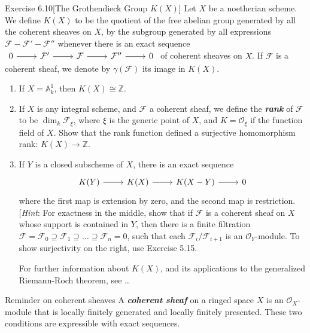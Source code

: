 \begin{thing2}{Exercise 6.10}[The Grothendieck Group $K(X)$]\leavevmode
	Let $X$ be a noetherian scheme. We define $K(X)$ to be the quotient of the free abelian group generated by all the coherent sheaves on $X$, by the subgroup generated by all expressions $\mathcal{F}-\mathcal{F}'-\mathcal{F}''$ whenever there is an exact sequence $\begin{tikzcd}
		0\arrow[r]&\mathcal{F}'\arrow[r]&\mathcal{F}\arrow[r]&\mathcal{F}''\arrow[r]&0
	\end{tikzcd}$ of coherent sheaves on $X$. If $\mathcal{F}$ is a coherent sheaf, we denote by $\gamma(\mathcal{F})$ its image in $K(X)$.
	 \begin{enumerate}[label=\alph*.]
		\item If $X=\mathbb{A}^1_k$, then $K(X)\cong \mathbb{Z}$.
		\item If $X$ is any integral scheme, and $\mathcal{F}$ a coherent sheaf, we define the \textit{\textbf{rank}} of $\mathcal{F}$ to be $\dim_k\mathcal{F}_\xi$, where $\xi$ is the generic point of $X$, and $K=\mathcal{O}_\xi$ if the function field of $X$. Show that the rank function defined a surjective homomorphism rank: $K(X)\longrightarrow \mathbb{Z}$.
		\item If $Y$ is a closed subscheme of  $X$, there is an exact sequence
			\[\begin{tikzcd}
				K(Y)\arrow[r]&K(X)\arrow[r]&K(X-Y)\arrow[r]&0
			\end{tikzcd}\]
		where the first map is extension by zero, and the second map is restriction. [\textit{Hint}: For exactness in the middle, show that if $\mathcal{F}$ is a coherent sheaf on $X$ whose support is contained in $Y$, then there is a finite filtration $\mathcal{F}=\mathcal{F}_0\supseteq \mathcal{F}_1\supseteq\ldots \supseteq\mathcal{F}_n=0$, such that each $\mathcal{F}_i/\mathcal{F}_{i+1}$ is an $\mathcal{O}_Y$-module. To show surjectivity on the right, use Exercise 5.15.

		For further information about $K(X)$, and its applications to the generalized Riemann-Roch theorem, see …
	\end{enumerate}
\end{thing2}

\begin{thing0}{Reminder on coherent sheaves}\leavevmode
	A \textit{\textbf{coherent sheaf}} on a ringed space $X$ is an $\mathcal{O}_X$-module that is locally finitely generated and locally finitely presented. These two conditions are expressible with exact sequences.\end{thing0}

